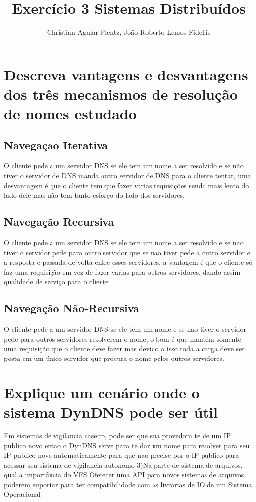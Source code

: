 \documentclass[12pt]{article}
\title{Exercício 3 Sistemas Distribuídos}
\author{Christian Aguiar Plentz\inst{1}, João Roberto Lemos Fidellis\inst{2} }
\begin{document}
 

\maketitle

\section{Descreva vantagens e desvantagens dos três mecanismos de resolução de nomes estudado}
	\subsection{Navegação Iterativa}
		O cliente pede a um servidor DNS se ele tem um nome a ser resolvido e se não tiver
		o servidor de DNS manda outro servidor de DNS para o cliente tentar, uma desvantagem
		é que o cliente tem que fazer varias requisições sendo mais lento do lado dele
		mas não tem tanto esforço do lado dos servidores.
	\subsection{Navegação Recursiva}
		O cliente pede a um servidor DNS se ele tem um nome a ser resolvido e se nao tiver
		o servidor pede para outro servidor que se nao tiver pede a outro servidor e a resposta
		e passada de volta entre esses servidores, a vantagem é que o cliente só faz uma requisição
		em vez de fazer varias para outros servidores, dando assim qualidade de serviço para o cliente
	\subsection{Navegação Não-Recursiva}
		O cliente pede a um servidor DNS se ele tem um nome e se nao tiver o servidor pede para
		outros servidores resolverem o nome, o bom é que mantém somente uma requisição que o cliente
		deve fazer mas devido a isso toda a carga deve ser posta em um único servidor que procura
		o nome pelos outros servidores.
\section{Explique um cenário onde o sistema DynDNS pode ser útil}
	Em sistemas de vigilancia caseiro, pode ser que sua provedora te de um IP publico novo
	entao o DynDNS serve para te dar um nome para resolver para seu IP publico novo automaticamente
	para que nao precise por o IP publico para acessar seu sistema de vigilancia autonomo
3)Na parte de sistema de arquivos, qual a importância do VFS
	Oferecer uma API para novos sistemas de arquivos poderem suportar para ter compatibilidade
	com as livrarias de IO de um Sistema Operacional
\end{document}

